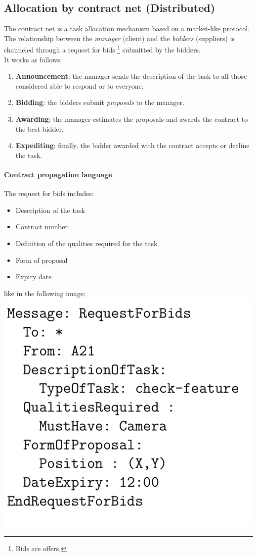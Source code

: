 \documentclass[10pt,a4paper]{article}
\begin{document}
\subsection{Allocation by contract net (Distributed)}
The contract net is a task allocation mechanism based on a market-like protocol. The relationship between the \textit{manager} (client) and the \textit{bidders} (suppliers)  is channeled through a request for bids \footnote{Bids are offers.} submitted by the bidders.\\
It works as follows:
\begin{enumerate}
\item \textbf{Announcement}: the manager sends the description of the task to all those considered able to respond or to everyone.
\item \textbf{Bidding}: the bidders submit \textit{proposals} to the manager.
\item \textbf{Awarding}: the manager estimates the proposals and awards the contract to the best bidder.
\item \textbf{Expediting}: finally, the bidder awarded with the contract accepts or decline the task.
\end{enumerate}


\paragraph{Contract propagation language}
The request for bids includes: 
\begin{itemize}
\item Description of the task
\item Contract number
\item Definition of the qualities required for the task
\item Form of proposal
\item Expiry date
\end{itemize}
like in the following image:\\
\includegraphics[scale=0.5]{images/contract_message.png}\\
\end{document}
